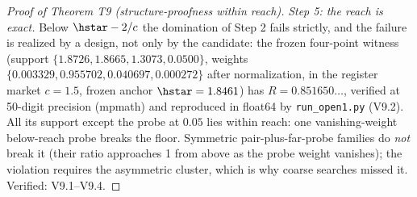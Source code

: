 \begin{proof}[Proof of Theorem T9 (structure-proofness within reach)]
\emph{Step 5: the reach is exact.} Below $\hstar - 2/c$ the
domination of Step 2 fails strictly, and the failure is realized by a
design, not only by the candidate: the frozen four-point witness
(support $\{1.8726, 1.8665, 1.3073, 0.0500\}$, weights
$\{0.003329, 0.955702, 0.040697, 0.000272\}$ after normalization, in
the register market $c = 1.5$, frozen anchor $\hstar = 1.8461$) has
$R = 0.851650\ldots$, verified at 50-digit precision (mpmath) and
reproduced in float64 by \texttt{run\_open1.py} (V9.2). All its
support except the probe at $0.05$ lies within reach: one
vanishing-weight below-reach probe breaks the floor. Symmetric
pair-plus-far-probe families do \emph{not} break it (their ratio
approaches 1 from above as the probe weight vanishes); the violation
requires the asymmetric cluster, which is why coarse searches missed
it. Verified: V9.1--V9.4.
\end{proof}

